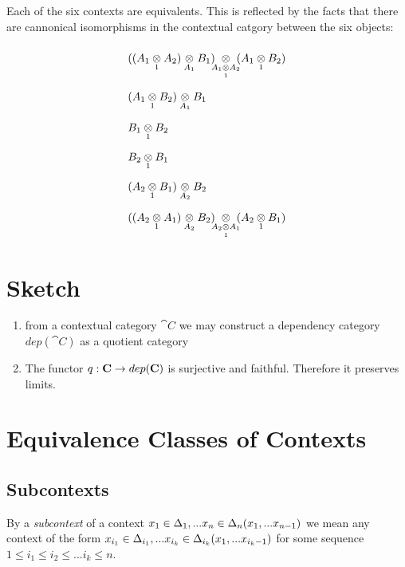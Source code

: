 \documentclass[10pt,a4paper]{scrartcl}
\begin{document}
Each of the six contexts are equivalents. This is reflected by the facts that there are cannonical 
isomorphisms in the contextual catgory between the six objects: \\
\begin{displaymath}
\def\arraystretch{2.2}
\begin{array} {l}
      \crossx
          {(\crossx
			       {(\crossx{A_1}{A_2}{1})}
						 {B_1}
						 {A_1}
			     ) 
			     \hspace{-0.2cm}
					}
					{\hspace{-0.2cm}(\crossx{A_1}{B_2}{1})}
					{\crossx{A_1}{A_2}{1}}
\\
    \crossx
       {(\crossx{A_1}{B_2}{1})}
							{B_1}
							{A_1}
\\

     \crossx{B_1}{B_2}{1}
\\
     \crossx{B_2}{B_1}{1}
\\
     \crossx
           {(\crossx{A_2}{B_1}{1})}
					 {B_2}
					 {A_2}
\\
     \crossx
              {(\crossx
							     {(\crossx{A_2}{A_1}{1})}
									 {B_2}
									 {A_2}
								) 
								\hspace{-0.2cm}
							}
							{\hspace{-0.2cm}(\crossx{A_2}{B_1}{1})}
							{\crossx{A_2}{A_1}{1}} 

\end{array}
\end{displaymath}

\section{Sketch}
\begin{enumerate}
\item{
from a contextual category $\cat{C}$ we may construct a dependency category $dep(\cat{C})$ as a quotient category
}
\item{
The functor $q:\textbf{C} \rightarrow dep(\textbf{C})$ is surjective and faithful.
Therefore it preserves limits.
}
\end{enumerate}




\section{Equivalence Classes of Contexts}
\subsection{Subcontexts}
By a \textit{subcontext} of a context $x_1 \in \Delta_1,... x_{n} \in \Delta_{n}(x_1,...x_{n-1})$ we mean any context
of the form
$x_{i_1} \in {\Delta}_{i_1},... x_{i_k} \in {\Delta}_{i_k}(x_1,...x_{i_k-1})$ for some sequence 
$1 \leq i_1 \leq i_2 \leq ... i_k \leq n$. \\
\end{document}
